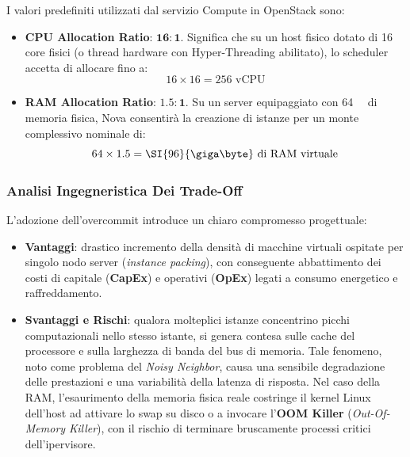 \documentclass[11pt, a4paper]{article}
\begin{document}
I valori predefiniti utilizzati dal servizio Compute in OpenStack sono:
\begin{itemize}
    \item \textbf{CPU Allocation Ratio}: $\mathbf{16:1}$. Significa che su un host fisico dotato di 16 core fisici (o thread hardware con Hyper-Threading abilitato), lo scheduler accetta di allocare fino a:
    \[
        16 \times 16 = 256 \text{ vCPU}
    \]
    \item \textbf{RAM Allocation Ratio}: $\mathbf{1.5:1}$. Su un server equipaggiato con \SI{64}{\giga\byte} di memoria fisica, Nova consentirà la creazione di istanze per un monte complessivo nominale di:
    \[
        64 \times 1.5 = \SI{96}{\giga\byte} \text{ di RAM virtuale}
    \]
\end{itemize}

\subsubsection{Analisi Ingegneristica Dei Trade-Off}

L'adozione dell'overcommit introduce un chiaro compromesso progettuale:
\begin{itemize}
    \item \textbf{Vantaggi}: drastico incremento della densità di macchine virtuali ospitate per singolo nodo server (\emph{instance packing}), con conseguente abbattimento dei costi di capitale (\textbf{CapEx}) e operativi (\textbf{OpEx}) legati a consumo energetico e raffreddamento.
    \item \textbf{Svantaggi e Rischi}: qualora molteplici istanze concentrino picchi computazionali nello stesso istante, si genera contesa sulle cache del processore e sulla larghezza di banda del bus di memoria. Tale fenomeno, noto come problema del \emph{Noisy Neighbor}, causa una sensibile degradazione delle prestazioni e una variabilità della latenza di risposta. Nel caso della RAM, l'esaurimento della memoria fisica reale costringe il kernel Linux dell'host ad attivare lo swap su disco o a invocare l'\textbf{OOM Killer} (\emph{Out-Of-Memory Killer}), con il rischio di terminare bruscamente processi critici dell'ipervisore.
\end{itemize}

\newpage

\end{document}
